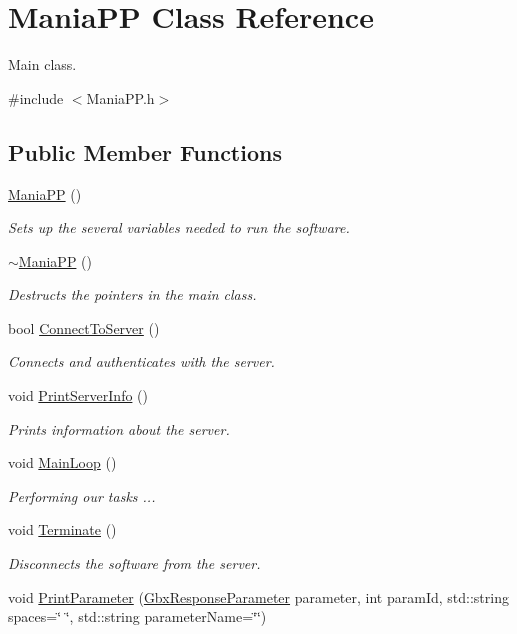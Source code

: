 \hypertarget{classManiaPP}{\section{Mania\-P\-P Class Reference}
\label{classManiaPP}
}


Main class.  




{\ttfamily \#include $<$Mania\-P\-P.\-h$>$}

\subsection*{Public Member Functions}
\begin{DoxyCompactItemize}
\item 
\hyperlink{classManiaPP_ae56f6623dc89f2c0b75bec631cfc2d19}{Mania\-P\-P} ()
\begin{DoxyCompactList}\small\item\em Sets up the several variables needed to run the software. \end{DoxyCompactList}\item 
\hyperlink{classManiaPP_a1c78c3b51db550609011fb6fdcb26ec8}{$\sim$\-Mania\-P\-P} ()
\begin{DoxyCompactList}\small\item\em Destructs the pointers in the main class. \end{DoxyCompactList}\item 
bool \hyperlink{classManiaPP_a22561171876e54dbf633c70d9924c06a}{Connect\-To\-Server} ()
\begin{DoxyCompactList}\small\item\em Connects and authenticates with the server. \end{DoxyCompactList}\item 
void \hyperlink{classManiaPP_a56d2774a29f21b3a164ae1f7ea6bd88b}{Print\-Server\-Info} ()
\begin{DoxyCompactList}\small\item\em Prints information about the server. \end{DoxyCompactList}\item 
void \hyperlink{classManiaPP_a8dff9e8e3835c3cac0df105a7bcce43c}{Main\-Loop} ()
\begin{DoxyCompactList}\small\item\em Performing our tasks ... \end{DoxyCompactList}\item 
void \hyperlink{classManiaPP_a87fd53fffe4a1840834a90ab575f5ce6}{Terminate} ()
\begin{DoxyCompactList}\small\item\em Disconnects the software from the server. \end{DoxyCompactList}\item 
void \hyperlink{classManiaPP_a39997219dc425fdea2d3c903e39c3860}{Print\-Parameter} (\hyperlink{classGbxResponseParameter}{Gbx\-Response\-Parameter} parameter, int param\-Id, std\-::string spaces=\char`\"{}    \char`\"{}, std\-::string parameter\-Name=\char`\"{}\char`\"{})
\end{DoxyCompactItemize}
